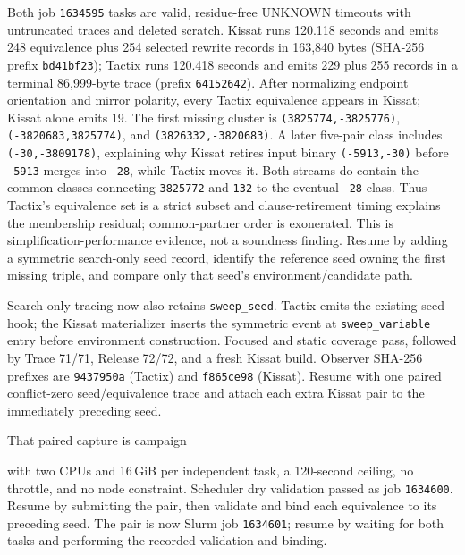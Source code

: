 \documentclass[11pt]{article}
\newcommand{\code}[1]{\texttt{#1}}
\newcommand{\artifact}[1]{\path{#1}}
\begin{document}
Both job \code{1634595} tasks are valid, residue-free UNKNOWN timeouts with
untruncated traces and deleted scratch. Kissat runs 120.118 seconds and emits
248 equivalence plus 254 selected rewrite records in 163,840 bytes (SHA-256
prefix \code{bd41bf23}); Tactix runs 120.418 seconds and emits 229 plus 255
records in a terminal 86,999-byte trace (prefix \code{64152642}). After
normalizing endpoint orientation and mirror polarity, every Tactix equivalence
appears in Kissat; Kissat alone emits 19. The first missing cluster is
\code{(3825774,-3825776)}, \code{(-3820683,3825774)}, and
\code{(3826332,-3820683)}. A later five-pair class includes
\code{(-30,-3809178)}, explaining why Kissat retires input binary
\code{(-5913,-30)} before \code{-5913} merges into \code{-28}, while Tactix
moves it. Both streams do contain the common classes connecting
\code{3825772} and \code{132} to the eventual \code{-28} class. Thus Tactix's
equivalence set is a strict subset and clause-retirement timing explains the
membership residual; common-partner order is exonerated. This is
simplification-performance evidence, not a soundness finding. Resume by adding
a symmetric search-only seed record, identify the reference seed owning the
first missing triple, and compare only that seed's environment/candidate path.

Search-only tracing now also retains \code{sweep\_seed}. Tactix emits the
existing seed hook; the Kissat materializer inserts the symmetric event at
\code{sweep\_variable} entry before environment construction. Focused and
static coverage pass, followed by Trace 71/71, Release 72/72, and a fresh
Kissat build. Observer SHA-256 prefixes are \code{9437950a} (Tactix) and
\code{f865ce98} (Kissat). Resume with one paired conflict-zero seed/equivalence
trace and attach each extra Kissat pair to the immediately preceding seed.

That paired capture is campaign
\begin{center}\small\artifact{20260819-1123-tierd-rank22-sweep-seeds}\end{center}
with two CPUs and 16\,GiB per independent task, a 120-second ceiling, no
throttle, and no node constraint. Scheduler dry validation passed as job
\code{1634600}. Resume by submitting the pair, then validate and bind each
equivalence to its preceding seed.
The pair is now Slurm job \code{1634601}; resume by waiting for both tasks and
performing the recorded validation and binding.
\end{document}

